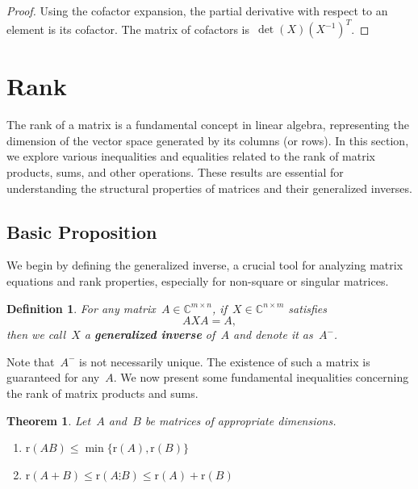 \documentclass[12pt]{article}
\newtheorem{theorem}{Theorem}[section]
\newtheorem{definition}{Definition}[section]
\newcommand{\rank}{\mathrm{r}}
\newcommand{\C}{\mathbb{C}}
\begin{document}
\begin{proof}
    Using the cofactor expansion, the partial derivative with respect to an element is its cofactor. The matrix of cofactors is~$\det(X) (X^{-1})^T$.
\end{proof}

\section{Rank}

The rank of a matrix is a fundamental concept in linear algebra, representing the dimension of the vector space generated by its columns (or rows). In this section, we explore various inequalities and equalities related to the rank of matrix products, sums, and other operations. These results are essential for understanding the structural properties of matrices and their generalized inverses.

\subsection{Basic Proposition}

We begin by defining the generalized inverse, a crucial tool for analyzing matrix equations and rank properties, especially for non-square or singular matrices.

\begin{definition}
For any matrix~$A \in \C^{m \times n}$, if~$X \in \C^{n \times m}$ satisfies
\[
AXA = A,
\]
then we call~$X$ a \textbf{generalized inverse} of~$A$ and denote it as~$A^-$.
\end{definition}

Note that~$A^-$ is not necessarily unique. The existence of such a matrix is guaranteed for any~$A$. We now present some fundamental inequalities concerning the rank of matrix products and sums.

\begin{theorem}
\label{thm:basic_rank}
Let~$A$ and~$B$ be matrices of appropriate dimensions.
\begin{enumerate}
    \item[(a)] $\rank(AB) \le \min \{\rank(A), \rank(B)\}$
    \item[(b)] $\rank(A + B) \le \rank(A \vdots B) \le \rank(A) + \rank(B)$
\end{enumerate}
\end{theorem}
\end{document}
